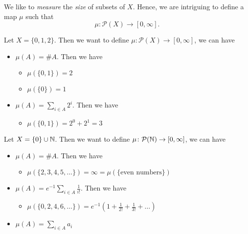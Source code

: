 We like to \emph{measure} the \emph{size} of subsets of \(X\). Hence, we are intriguing to define a map \(\mu\) such that
\[
	\mu\colon \mathcal{P}(X) \to \left[0, \infty\right].
\]
\begin{eg}
	Let \(X = \{0, 1, 2\}\). Then we want to define \(\mu\colon \mathcal{P}(X)\to \left[0, \infty\right] \), we can have
	\begin{itemize}
		\item \(\mu(A) = \# A\). Then we have
		      \begin{itemize}
			      \item \(\mu(\{0, 1\}) = 2\)
			      \item \(\mu(\{0\}) = 1\)
		      \end{itemize}
		\item \(\mu(A) = \sum\limits_{i\in A} 2^i\). Then we have
		      \begin{itemize}
			      \item \(\mu(\{0, 1\}) = 2^0 + 2^1 = 3\)
		      \end{itemize}
	\end{itemize}
\end{eg}
\begin{eg}
	Let \(X = \{0\}\cup \mathbb{\MakeUppercase{N}} \). Then we want to define \(\mu\colon \mathcal{P}(\mathbb{\MakeUppercase{N}} )\to \left[0, \infty\right] \), we can have
	\begin{itemize}
		\item \(\mu(A) = \# A\). Then we have
		      \begin{itemize}
			      \item \(\mu(\{2, 3, 4, 5, \ldots  \}) = \infty = \mu(\{\text{even numbers} \})\)
		      \end{itemize}
		\item \(\mu(A) = e^{-1}\sum\limits_{i\in A}\frac{1}{i!}\). Then we have
		      \begin{itemize}
			      \item \(\mu(\{0, 2, 4, 6, \ldots \}) = e^{-1} \left(1+\frac{1}{2!}+\frac{1}{3!}+\ldots  \right)\)
		      \end{itemize}
		\item \(\mu(A) = \sum\limits_{i\in A} a_{i}\)
	\end{itemize}
\end{eg}
